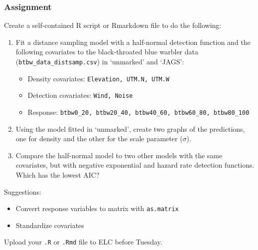 \documentclass[color=usenames,dvipsnames]{beamer}\usepackage[]{graphicx}\usepackage[]{color}
\newcommand{\inr}[1]{\colorbox{inlinecolor}{\texttt{#1}}}
\begin{document}
\begin{frame}[fragile]
  \frametitle{Assignment}
  \footnotesize
  Create a self-contained R script or Rmarkdown file to do the following:
  \vfill
  \begin{enumerate}
    \footnotesize
    \item Fit a distance sampling model with a half-normal detection
      function and the following covariates to the black-throated blue
      warbler data ({\tt btbw\_data\_distsamp.csv}) in `unmarked' and
      `JAGS':   
      \begin{itemize}
        \footnotesize
        \item Density covariates: {\tt Elevation, UTM.N, UTM.W}
        \item Detection covariates: {\tt Wind, Noise}
        \item Response: {\scriptsize \tt btbw0\_20, btbw20\_40, btbw40\_60, btbw60\_80, btbw80\_100}
      \end{itemize}
    \item Using the model fitted in `unmarked', create two graphs of
      the predictions, one for density and the other for the scale
      parameter ($\sigma$).
    \item Compare the half-normal model to two other models with the
      same covariates, but with negative exponential and hazard
      rate detection functions. Which has the lowest AIC? 
  \end{enumerate}
  \pause
  \vfill
  Suggestions:
  \begin{itemize}
    \item Convert response variables to matrix with \inr{as.matrix}
    \item Standardize covariates
  \end{itemize}
  \pause
  \vfill
  Upload your {\tt .R} or {\tt .Rmd} file to ELC before Tuesday. 
\end{frame}
\end{document}
